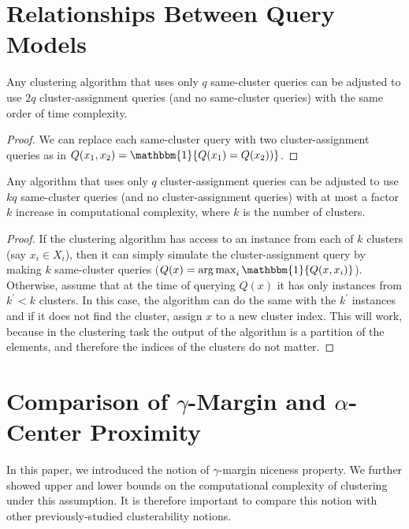 \def\COMPLETE{}
\section{Relationships Between Query Models}
\label{appendix:diffQueryModels}

\begin{proposition}
Any clustering algorithm that uses only $q$ same-cluster queries can be adjusted to use $2q$ cluster-assignment queries (and no same-cluster queries) with the same order of time complexity.
\end{proposition}
\begin{proof}
We can replace each same-cluster query with two cluster-assignment queries as in $Q(x_1,x_2)={\mathbbm{1}}\{Q(x_1)=Q(x_2))\}$.
\end{proof}

\begin{proposition}
Any algorithm that uses only $q$ cluster-assignment queries can be adjusted to use $kq$ same-cluster queries (and no cluster-assignment queries) with at most a factor $k$ increase in computational complexity, where $k$ is the number of clusters.
\end{proposition}
\begin{proof}
If the clustering algorithm has access to an instance from each of $k$ clusters (say $x_i\in X_i$), then it can simply simulate the cluster-assignment query by making $k$ same-cluster queries ($Q(x) = \argmax_{i}\mathbbm{1}\{Q(x, x_i)\}$). Otherwise, assume that at the time of querying $Q(x)$ it has only instances from $k^\prime<k$ clusters. In this case, the algorithm can do the same with the $k^\prime$ instances and if it does not find the cluster, assign $x$ to a new cluster index. This will work, because in the clustering task the output of the algorithm is a partition of the elements, and therefore the indices of the clusters do not matter.
\end{proof}




\section{Comparison of $\gamma$-Margin and $\alpha$-Center Proximity}
\label{appendix:gammaMrginVsAlphaCenter}

In this paper, we introduced the notion of $\gamma$-margin niceness property. We further showed upper and lower bounds on the computational complexity of clustering under this assumption. It is therefore important to compare this notion with other previously-studied clusterability notions.

